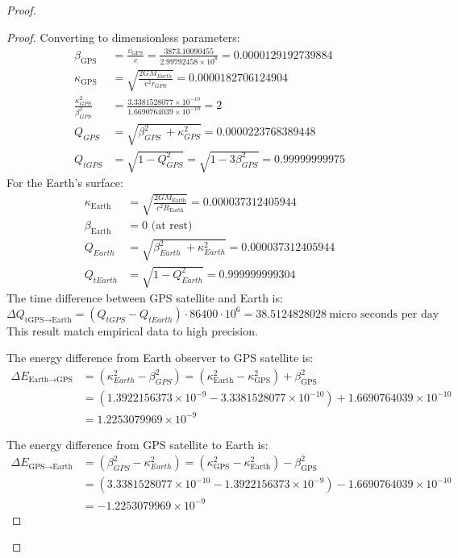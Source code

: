 \documentclass{article}
\begin{document}
\begin{theorem}
\begin{proof}
\begin{proof}
Converting to dimensionless parameters:
\begin{align}
\beta_{\text{GPS}} &= \frac{v_{\text{GPS}}}{c} = \frac{3873.10090455}{2.99792458 \times 10^8} =0.0000129192739884 \\
\kappa_{\text{GPS}} &= \sqrt{\frac{2GM_{Earth}}{c^2 r_{GPS}}} =0.0000182706124904 \\
\frac{\kappa_{GPS}^{2}}{\beta_{GPS}^{2}} &=\frac{3.3381528077\times10^{-10}}{1.6690764039\times10^{-10}}=2 \\
Q_{GPS} &=\sqrt{\beta_{GPS}^{2}\ +\kappa_{GPS}^{2}}=0.0000223768389448 \\
Q_{tGPS} &=\sqrt{1-Q_{GPS}^{2}}=\sqrt{1-3\beta_{GPS}^{2}}=0.99999999975
\end{align}
For the Earth's surface:
\begin{align}
\kappa_{\text{Earth}} &= \sqrt{\frac{2GM_{\text{Earth}}}{c^2 R_{\text{Earth}}}} = 0.000037312405944\\
\beta_{\text{Earth}} &= 0 \text{ (at rest)} \\
Q_{Earth} &=\sqrt{\beta_{Earth}^{2}\ +\kappa_{Earth}^{2}}=0.000037312405944 \\
Q_{tEarth} &=\sqrt{1-Q_{Earth}^{2}}=0.999999999304
\end{align}
The time difference between GPS satellite and Earth is:
\[
\Delta Q_{\text{tGPS} \rightarrow \text{Earth}}=(Q_{tGPS}-Q_{tEarth})\cdot 86400  \cdot  10^6  = 38.5124828028 \ \text{micro seconds per day}
\]
This result match empirical data to high precision.

The energy difference from Earth observer to GPS satellite is:
\begin{align}
\Delta E_{\text{Earth} \rightarrow \text{GPS}} &=\left(\kappa_{Earth}^{2}-\beta_{GPS}^{2}\right)= (\kappa^2_{\text{Earth}} - \kappa^2_{\text{GPS}}) + \beta^2_{\text{GPS}} \\
&= (1.3922156373\times10^{-9} - 3.3381528077\times10^{-10}) + 1.6690764039\times10^{-10} \\
&= 1.2253079969\times10^{-9}
\end{align}

The energy difference from GPS satellite to Earth is:
\begin{align}
\Delta E_{\text{GPS} \rightarrow \text{Earth}} &= \left(\beta_{GPS}^{2}-\kappa_{Earth}^{2}\right)=(\kappa^2_{\text{GPS}} - \kappa^2_{\text{Earth}}) - \beta^2_{\text{GPS}} \\
&= (3.3381528077\times10^{-10} - 1.3922156373\times10^{-9}) - 1.6690764039\times10^{-10} \\
&= -1.2253079969\times10^{-9}
\end{align}


\end{proof}
\end{proof}
\end{theorem}
\end{document}
